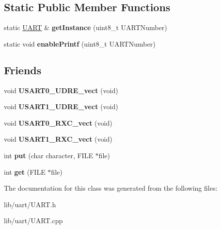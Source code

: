 \subsection*{Static Public Member Functions}
\begin{DoxyCompactItemize}
\item 
\hypertarget{class_u_a_r_t_ac2b3a438146c6c7a320fadaebf2eccb6}{static \hyperlink{class_u_a_r_t}{U\-A\-R\-T} \& {\bfseries get\-Instance} (uint8\-\_\-t U\-A\-R\-T\-Number)}\label{class_u_a_r_t_ac2b3a438146c6c7a320fadaebf2eccb6}

\item 
\hypertarget{class_u_a_r_t_a7b0dade1a33e0dfbf3a6d47f758c9a63}{static void {\bfseries enable\-Printf} (uint8\-\_\-t U\-A\-R\-T\-Number)}\label{class_u_a_r_t_a7b0dade1a33e0dfbf3a6d47f758c9a63}

\end{DoxyCompactItemize}
\subsection*{Friends}
\begin{DoxyCompactItemize}
\item 
\hypertarget{class_u_a_r_t_a1d51fae19a485f9402d797a729e4b2d8}{void {\bfseries U\-S\-A\-R\-T0\-\_\-\-U\-D\-R\-E\-\_\-vect} (void)}\label{class_u_a_r_t_a1d51fae19a485f9402d797a729e4b2d8}

\item 
\hypertarget{class_u_a_r_t_afd1c15ac65790c3c4b1e37242b633309}{void {\bfseries U\-S\-A\-R\-T1\-\_\-\-U\-D\-R\-E\-\_\-vect} (void)}\label{class_u_a_r_t_afd1c15ac65790c3c4b1e37242b633309}

\item 
\hypertarget{class_u_a_r_t_a0e5896026896194759cd6023db261a71}{void {\bfseries U\-S\-A\-R\-T0\-\_\-\-R\-X\-C\-\_\-vect} (void)}\label{class_u_a_r_t_a0e5896026896194759cd6023db261a71}

\item 
\hypertarget{class_u_a_r_t_af638ffcf2ff061c04bcbfd08843cd6dd}{void {\bfseries U\-S\-A\-R\-T1\-\_\-\-R\-X\-C\-\_\-vect} (void)}\label{class_u_a_r_t_af638ffcf2ff061c04bcbfd08843cd6dd}

\item 
\hypertarget{class_u_a_r_t_a854705f4b3860a07037f673a0e22f162}{int {\bfseries put} (char character, F\-I\-L\-E $\ast$file)}\label{class_u_a_r_t_a854705f4b3860a07037f673a0e22f162}

\item 
\hypertarget{class_u_a_r_t_a48cb91142598bdc56c2ee433bcd63633}{int {\bfseries get} (F\-I\-L\-E $\ast$file)}\label{class_u_a_r_t_a48cb91142598bdc56c2ee433bcd63633}

\end{DoxyCompactItemize}


The documentation for this class was generated from the following files\-:\begin{DoxyCompactItemize}
\item 
lib/uart/U\-A\-R\-T.\-h\item 
lib/uart/U\-A\-R\-T.\-cpp\end{DoxyCompactItemize}
